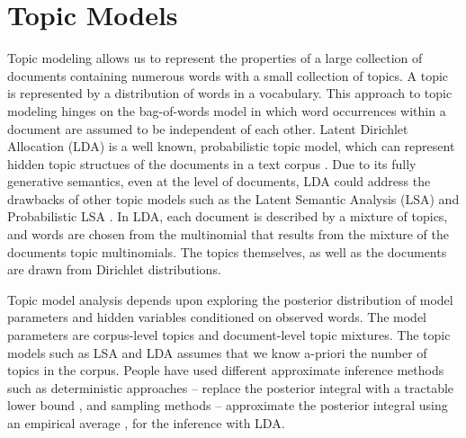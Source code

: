 \section{Topic Models}


Topic modeling allows us to represent the properties of a 
large collection of documents containing numerous words 
with a small collection of topics. 
A topic is represented by a  
distribution of words in a vocabulary.  This approach to 
topic modeling hinges on the bag-of-words model in which 
word occurrences within a document are assumed to be 
independent of each other. 
Latent Dirichlet Allocation (LDA) is a well known, probabilistic 
topic model, which can represent hidden topic structues 
of the documents in a text corpus \cite{Blei2003}. Due to 
its fully generative semantics, even at the level of documents, 
LDA could address the drawbacks of other topic models such as 
the Latent Semantic Analysis (LSA) and Probabilistic LSA \cite{Hofmann1999,Blei2003}. 
In LDA, each document is described by 
a mixture of topics, and words are chosen from the multinomial 
that results from the mixture of the documents topic 
multinomials. The topics themselves, as well as the 
documents are drawn from Dirichlet distributions. 

Topic model analysis depends upon exploring the posterior 
distribution of model parameters and hidden variables 
conditioned on observed words. The model parameters are 
corpus-level topics and document-level topic mixtures. 
The topic models such as LSA and LDA assumes that 
we know a-priori the number of topics in the corpus. 
People have used different approximate inference methods
such as deterministic approaches -- replace the posterior 
integral with a tractable lower bound \cite{Blei2003}, 
and sampling methods -- approximate the posterior integral 
using an empirical average \cite{Griffiths2004}, for the 
inference with LDA. 


